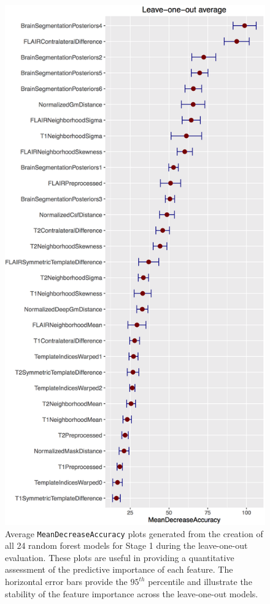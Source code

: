 \documentclass[11pt,]{article}
\begin{document}
\begin{figure}[htbp]
\centering
\includegraphics{Figures/averageLeaveOneOutStage1.png}
\caption{Average \texttt{MeanDecreaseAccuracy} plots generated from the
creation of all 24 random forest models for Stage 1 during the
leave-one-out evaluation. These plots are useful in providing a
quantitative assessment of the predictive importance of each feature.
The horizontal error bars provide the \(95^{th}\) percentile
 and illustrate the
stability of the feature importance across the leave-one-out models.
}
\end{figure}
\end{document}
